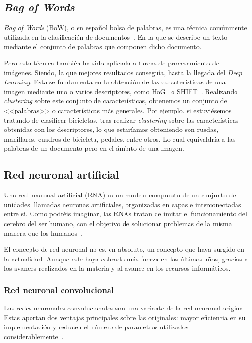 \subsection{\textit{Bag of Words}}
\label{bow}
\textit{Bag of Words} (BoW), o en español bolsa de palabras, es una técnica comúnmente utilizada en la clasificación de documentos~\cite{wiki:bowmodel}. En la que se describe un texto mediante el conjunto de palabras que componen dicho documento.

Pero esta técnica también ha sido aplicada a tareas de procesamiento de imágenes. Siendo, la que mejores resultados conseguía, hasta la llegada del \textit{Deep Learning}. Esta se fundamenta en la obtención de las características de una imagen mediante uno o varios descriptores, como HoG~\cite{wiki:hog} o SHIFT~\cite{shift}. Realizando \textit{clustering} sobre este conjunto de características, obtenemos un conjunto de <<palabras>> o características más generales. Por ejemplo, si estuviésemos tratando de  clasificar bicicletas, tras realizar \textit{clustering} sobre las características obtenidas con los descriptores, lo que estaríamos obteniendo son ruedas, manillares, cuadros de bicicleta, pedales, entre otros. Lo cual equivaldría a las palabras de un documento pero en el ámbito de una imagen.

\subsection{Red neuronal artificial}

Una red neuronal artificial (RNA) es un modelo compuesto de un conjunto de unidades, llamadas neuronas artificiales, organizadas en capas e interconectadas entre sí. Como podréis imaginar, las RNAs tratan de imitar el funcionamiento del cerebro del ser humano, con el objetivo de solucionar problemas de la misma manera que los humanos~\cite{wiki:ann}.

El concepto de red neuronal no es, en absoluto, un concepto que haya surgido en la actualidad. Aunque este haya cobrado más fuerza en los últimos años, gracias a los avances realizados en la materia y al avance en los recursos informáticos.

\subsubsection{Red neuronal convolucional}

Las redes neuronales convolucionales son una variante de la red neuronal original. Estas aportan dos ventajas principales sobre las originales: mayor eficiencia en su implementación y reducen el número de parametros utilizados considerablemente~\cite{cnn}.


